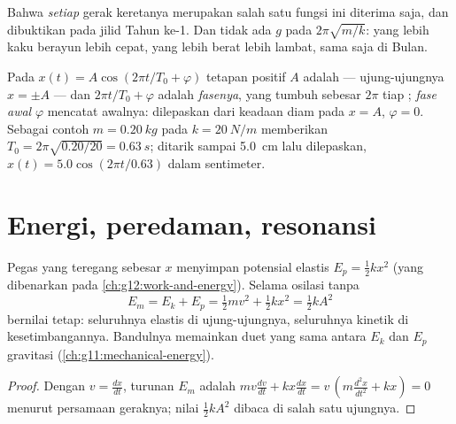 \begin{remark}\label{rem:g12:oscillators-and-time:uniqueness}
Bahwa \emph{setiap} gerak keretanya merupakan salah satu fungsi ini
diterima saja, dan dibuktikan pada jilid Tahun ke-1. Dan tidak ada $g$ pada $2\pi\sqrt{m/k}$:
yang lebih kaku berayun lebih cepat, yang lebih berat lebih lambat, sama saja di Bulan.
\end{remark}

\begin{definition}\label{def:g12:oscillators-and-time:phase}
Pada $x(t) = A\cos(2\pi t/T_0 + \varphi)$ tetapan positif $A$ adalah
 --- ujung-ujungnya $x = \pm A$ --- dan $2\pi t/T_0 +
\varphi$ adalah \emph{fasenya}, yang tumbuh sebesar $2\pi$ tiap
; \emph{fase awal} $\varphi$
mencatat awalnya: dilepaskan dari keadaan diam pada $x = A$, $\varphi = 0$. Sebagai
contoh $m = \qty{0.20}{kg}$ pada $k = \qty{20}{N/m}$ memberikan $T_0 =
2\pi\sqrt{0.20/20} = \qty{0.63}{s}$; ditarik sampai \qty{5.0}{cm} lalu
dilepaskan, $x(t) = 5.0\cos(2\pi t/0.63)$ dalam sentimeter.
\end{definition}

\section{Energi, peredaman, resonansi}

\begin{proposition}\label{prop:g12:oscillators-and-time:energy}
Pegas yang teregang sebesar $x$ menyimpan  potensial elastis $E_p =
\tfrac12 kx^2$ (yang dibenarkan pada \cref{ch:g12:work-and-energy}). Selama
osilasi tanpa  
\[
E_m = E_k + E_p = \tfrac12 m v^2 + \tfrac12 k x^2 = \tfrac12 k A^2
\]
bernilai tetap: seluruhnya elastis di ujung-ujungnya, seluruhnya kinetik di
kesetimbangannya. Bandulnya memainkan duet yang sama antara $E_k$ dan
$E_p$ gravitasi (\cref{ch:g11:mechanical-energy}).
\end{proposition}

\begin{proof}
Dengan $v = \frac{dx}{dt}$, turunan $E_m$ adalah $mv\frac{dv}{dt}
+ kx\frac{dx}{dt} = v\,(m\frac{d^2x}{dt^2} + kx) = 0$ menurut persamaan
geraknya; nilai $\tfrac12 kA^2$ dibaca di salah satu ujungnya.
\end{proof}

